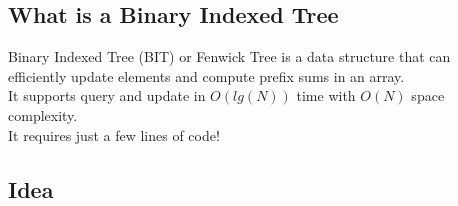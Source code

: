 \subsection{What is a Binary Indexed Tree}

Binary Indexed Tree (BIT) or Fenwick Tree is a data structure that can efficiently update
elements and compute prefix sums in an array.\\

It supports query and update in $O(lg(N))$ time with $O(N)$ space complexity.\\

It requires just a few lines of code!

\subsection{Idea}

